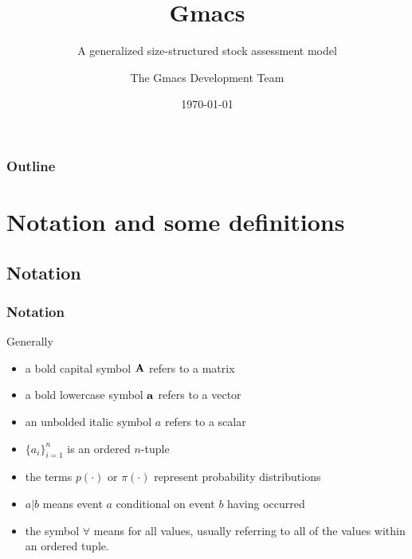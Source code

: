 \documentclass{beamer}
\title{Gmacs}
\subtitle{A generalized size-structured stock assessment model}
\author{The Gmacs Development Team}
\date{\today}
\begin{document}

\begin{frame}
\titlepage
\end{frame}


\begin{frame}
\frametitle{Outline}
\tableofcontents
\end{frame}


\section{Notation and some definitions}


\subsection{Notation}
\begin{frame}
\frametitle{Notation}
Generally
\begin{itemize}
\item a bold capital symbol ${\bf A}$ refers to a matrix
\item a bold lowercase symbol ${\bf a}$ refers to a vector
\item an unbolded italic symbol $a$ refers to a scalar
\item $\{ a_i \}^n_{i=1}$ is an ordered $n$-tuple
\item the terms $p(\cdot)$ or $\pi(\cdot)$ represent probability
  distributions
\item $a|b$ means event $a$ conditional on event $b$ having occurred
\item the symbol $\forall$ means for all values, usually referring to all of the
  values within an ordered tuple.
\end{itemize}
\end{frame}

\end{document}
